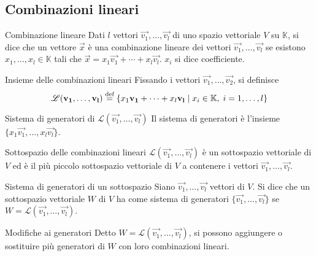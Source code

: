 \subsection{Combinazioni lineari}%
\label{sub:combinazioni_lineari}

\begin{Def}{Combinazione lineare}
  Dati $l$ vettori $\vec{v_1},\ldots,\vec{v_l}$ di uno spazio vettoriale $V$ su
  $\mathbb{K}$, si dice che un vettore $\vec{x}$ è una combinazione lineare dei vettori
  $\vec{v_1},\ldots,\vec{v_l}$ se esistono $x_1,\ldots,x_l\in\mathbb{K}$ tali che
  $\vec{x}=x_1\vec{v_1}+\cdots+x_l\vec{v_l}$. $x_i$ si dice coefficiente.
\end{Def}

\begin{Def}{Insieme delle combinazioni lineari}
  Fissando i vettori $\vec{v_1},\ldots,\vec{v_2}$, si definisce
  \begin{equation*}
    \mathscr{L}(\vec{v_1},\ldots,\vec{v_l})\bydef \left\{
    x_1\vec{v_1}+\cdots+x_l\vec{v_l} \Setsuchthat x_i\in\mathbb{K},\;i=1,\ldots,l \right\}
  \end{equation*}
\end{Def}

\begin{Def}{Sistema di generatori di $\mathscr{L}(\vec{v_1},\ldots,\vec{v_l})$}
  Il sistema di generatori è l'insieme $\{x_1\vec{v_1},\ldots,x_l\vec{v_l}\}$.
\end{Def}

\begin{Thm}{Sottospazio delle combinazioni lineari}
  $\mathscr{L}(\vec{v_1},\ldots,\vec{v_l})$ è un sottospazio vettoriale di $V$ ed è il
  più piccolo sottospazio vettoriale di $V$ a contenere i vettori
  $\vec{v_1},\ldots,\vec{v_l}$.
\end{Thm}

\begin{Def}{Sistema di generatori di un sottospazio}
  Siano $\vec{v_1},\ldots,\vec{v_l}$ vettori di $V$. Si dice che un sottospazio
  vettoriale $W$ di $V$ ha come sistema di generatori $\{\vec{v_1},\ldots,\vec{v_l}\}$
  se $W=\mathscr{L}(\vec{v_1},\ldots,\vec{v_l})$.
\end{Def}

\begin{Thm}{Modifiche ai generatori}
  Detto $W=\mathscr{L}(\vec{v_1},\ldots,\vec{v_l})$, si possono aggiungere o sostituire
  più generatori di $W$ con loro combinazioni lineari.
\end{Thm}

